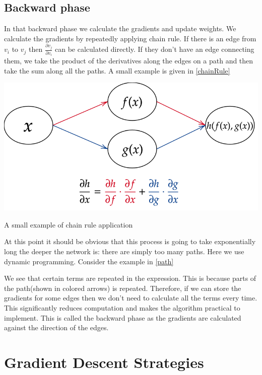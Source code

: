 \subsection{Backward phase}
In that backward phase we calculate the gradients and update weights. We calculate the gradients by repeatedly applying chain rule. If there is an edge from $v_i$ to $v_j$ then $\frac{\partial v_j}{\partial v_i}$ can be calculated directly.  If they don't have an edge connecting them, we take the product of the derivatives  along the edges on a path and then take the sum along all the paths. A small example is given in \ref{chainRule}
\begin{marginfigure}
    \begin{center}
        \includegraphics[width=\textwidth]{graphics/chain.png}
    \end{center}
    \caption{A small example of chain rule application}\label{chainRule}
\end{marginfigure}  
At this point it should be obvious that this process is going to take exponentially long the deeper the network is: there are simply too many paths. Here we use dynamic programming. Consider the example in \ref{path}

We see that certain terms are repeated in the expression. This is because parts of the path(shown in colored arrows) is repeated. Therefore, if we can store the gradients for some edges then we don't need to calculate all the terms every time. This significantly reduces computation and makes the algorithm practical to implement. This is called the backward phase as the gradients are calculated against the direction of the edges. 
\section{Gradient Descent Strategies}

